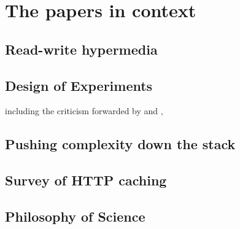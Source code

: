 \section{The papers in context}

\subsection{Read-write hypermedia}\label{sec:conlapis}

\subsection{Design of Experiments}\label{sec:condoe}

including the criticism forwarded by
\cite{Duan:2011:AOC:1989323.1989340} and \cite{MontoyaVCRA12},

\subsection{Pushing complexity down the stack}\label{sec:conpush}

\subsection{Survey of HTTP caching}\label{sec:consanity}

\subsection{Philosophy of Science}\label{sec:conphil}
